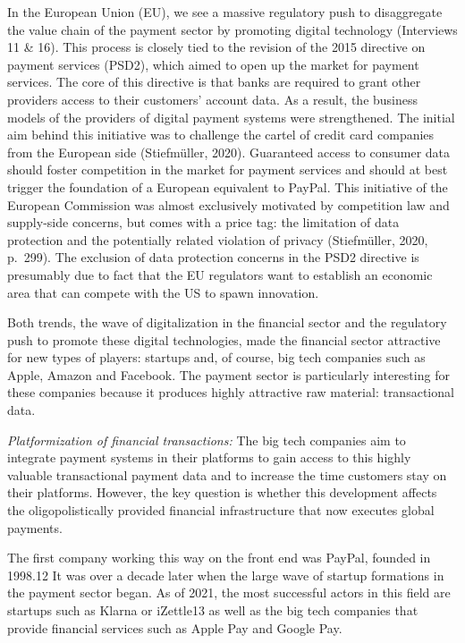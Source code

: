 \documentclass[
]{book}
\begin{document}
In the European Union (EU), we see a massive regulatory push to disaggregate the value chain of the payment sector by promoting digital technology (Interviews 11 \& 16). This process is closely tied to the revision of the 2015 directive on payment services (PSD2), which aimed to open up the market for payment services. The core of this directive is that banks are required to grant other providers access to their customers' account data. As a result, the business models of the providers of digital payment systems were strengthened. The initial aim behind this initiative was to challenge the cartel of credit card companies from the European side (Stiefmüller, 2020). Guaranteed access to consumer data should foster competition in the market for payment services and should at best trigger the foundation of a European equivalent to PayPal. This initiative of the European Commission was almost exclusively motivated by competition law and supply-side concerns, but comes with a price tag: the limitation of data protection and the potentially related violation of privacy (Stiefmüller, 2020, p.~299). The exclusion of data protection concerns in the PSD2 directive is presumably due to fact that the EU regulators want to establish an economic area that can compete with the US to spawn innovation.

Both trends, the wave of digitalization in the financial sector and the regulatory push to promote these digital technologies, made the financial sector attractive for new types of players: startups and, of course, big tech companies such as Apple, Amazon and Facebook. The payment sector is particularly interesting for these companies because it produces highly attractive raw material: transactional data.

\emph{Platformization of financial transactions:} The big tech companies aim to integrate payment systems in their platforms to gain access to this highly valuable transactional payment data and to increase the time customers stay on their platforms. However, the key question is whether this development affects the oligopolistically provided financial infrastructure that now executes global payments.

The first company working this way on the front end was PayPal, founded in 1998.12 It was over a decade later when the large wave of startup formations in the payment sector began. As of 2021, the most successful actors in this field are startups such as Klarna or iZettle13 as well as the big tech companies that provide financial services such as Apple Pay and Google Pay.
\end{document}

